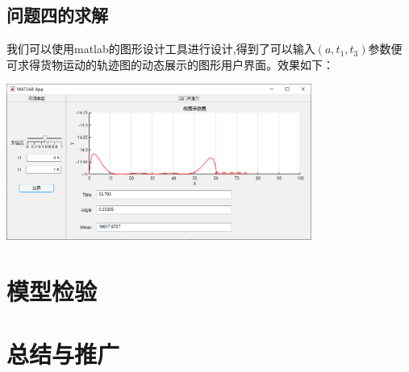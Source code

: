 \documentclass[withoutpreface,bwprint]{cumcmthesis} %
\begin{document}
\subsection{问题四的求解}
我们可以使用matlab的图形设计工具进行设计,得到了可以输入$(a,t_1,t_3)$参数便可求得货物运动的轨迹图的动态展示的图形用户界面。效果如下：

\centerline{\includegraphics[width=10cm]{p4.png}}


\section{模型检验}
\subsection{}
\section{总结与推广}
\end{document}
